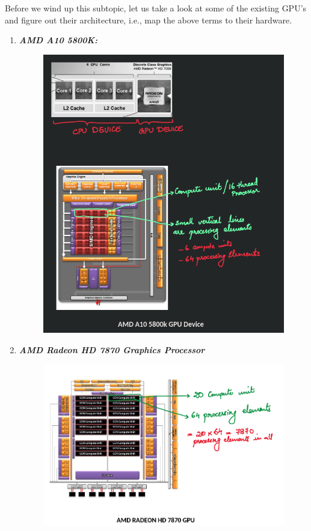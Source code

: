\documentclass[10pt]{article}
\begin{document}
Before we wind up this subtopic, let us take a look at some of the existing GPU's and figure out their architecture, i.e., map the above terms to their hardware.

\begin{enumerate}
	\item \textit{\textbf{AMD A10 5800K:}}
		\begin{figure}[H]
		  \centering
		  \includegraphics[scale=0.7]{./images/1_Amd_a10_5800k_GPU_Device.png}
		\end{figure}
	\item \textit{\textbf{AMD Radeon HD 7870 Graphics Processor}}
		\begin{figure}[H]
		  \centering
		  \includegraphics[scale=0.6]{./images/2_AMD_Radeon_HD_7870_GPU_Device.png}
		\end{figure}
\end{enumerate}
\end{document}
